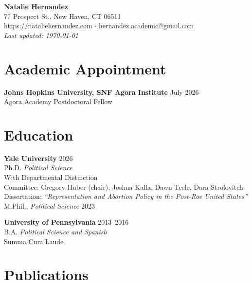 \documentclass[11pt]{article}
\begin{document}
\begin{center}
\huge \textbf{Natalie Hernandez} \\
\vspace{0.5em}
\normalsize
77 Prospect St., New Haven, CT 06511 \\
\href{https://nataliehernandez.com}{https://nataliehernandez.com} $\cdot$
\href{mailto:hernandez.academic@gmail.com}{hernandez.academic@gmail.com} \\
\textit{Last updated: \today}
\normalsize
\end{center}

\section*{Academic Appointment}
\textbf{Johns Hopkins University, SNF Agora Institute } \hfill July 2026- \\
Agora Academy Postdoctoral Fellow

\section*{Education}
\textbf{Yale University} \hfill 2026 \\
Ph.D. \textit{Political Science} \\
\hspace*{1em} With Departmental Distinction \\ 
\hspace*{1em} Committee: Gregory Huber (chair), Joshua Kalla, Dawn Teele, Dara Strolovitch \\
\hspace*{1em} Dissertation: \emph{“Representation and Abortion Policy in the Post-Roe United States”} \\
M.Phil., \textit{Political Science} \hfill 2023

\textbf{University of Pennsylvania}  \hfill 2013--2016 \\
B.A. \textit{Political Science and Spanish} \\
\hspace*{1em} Summa Cum Laude 


\section*{Publications}
\end{document}
